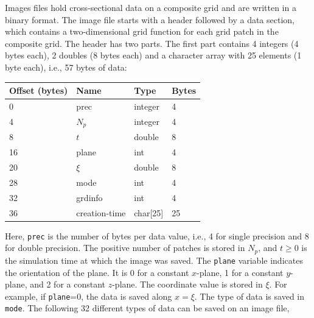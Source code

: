 \documentclass[11pt]{report}
\begin{document}
Images files hold cross-sectional data on a composite grid and are written in a binary format. The
image file starts with a header followed by a data section, which contains a two-dimensional grid
function for each grid patch in the composite grid. The header has two parts. The first part
contains 4 integers (4 bytes each), 2 doubles (8 bytes each) and a character array with 25 elements
(1 byte each), i.e., 57 bytes of data:
\begin{center}
\begin{tabular}{llll}\hline
Offset (bytes) & Name & Type & Bytes \\ \hline
0 & prec & integer & 4 \\ \hline
4 & $N_p$ & integer & 4 \\ \hline
8 & $t$ & double & 8 \\ \hline
16 & plane & int & 4 \\ \hline
20 & $\xi$ & double & 8 \\ \hline
28 & mode & int & 4 \\ \hline
32 & grdinfo & int & 4 \\ \hline
36 & creation-time & char[25] & 25 \\ \hline
\end{tabular}
\end{center}
Here, {\tt prec} is the number of bytes per data value, i.e., 4 for single precision and 8 for
double precision. The positive number of patches is stored in $N_p$, and $t\geq 0$ is the simulation
time at which the image was saved. The {\tt plane} variable indicates the orientation of the
plane. It is 0 for a constant $x$-plane, 1 for a constant $y$-plane, and 2 for a constant
$z$-plane. The coordinate value is stored in $\xi$. For example, if {\tt plane}=0, the data is saved
along $x=\xi$. The type of data is saved in {\tt mode}. The following 32 different types of data can
be saved on an image file,
\end{document}
